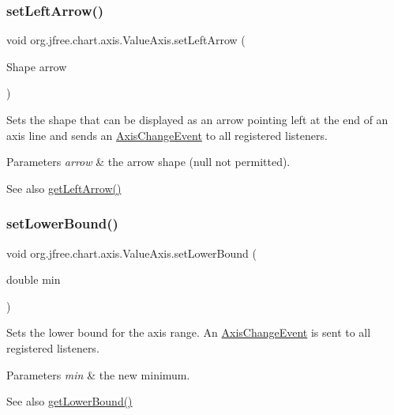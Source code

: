 \subsubsection{\texorpdfstring{set\+Left\+Arrow()}{setLeftArrow()}}
{\footnotesize\ttfamily void org.\+jfree.\+chart.\+axis.\+Value\+Axis.\+set\+Left\+Arrow (\begin{DoxyParamCaption}\item[{Shape}]{arrow }\end{DoxyParamCaption})}

Sets the shape that can be displayed as an arrow pointing left at the end of an axis line and sends an \mbox{\hyperlink{}{Axis\+Change\+Event}} to all registered listeners.


\begin{DoxyParams}{Parameters}
{\em arrow} & the arrow shape ({\ttfamily null} not permitted).\\
\hline
\end{DoxyParams}
\begin{DoxySeeAlso}{See also}
\mbox{\hyperlink{classorg_1_1jfree_1_1chart_1_1axis_1_1_value_axis_a68bc86e19cb0a68264f057981ecb4963}{get\+Left\+Arrow()}} 
\end{DoxySeeAlso}
\mbox{\label{classorg_1_1jfree_1_1chart_1_1axis_1_1_value_axis_a0d48d13633027f697aa6f909bc39444c}} 
\subsubsection{\texorpdfstring{set\+Lower\+Bound()}{setLowerBound()}}
{\footnotesize\ttfamily void org.\+jfree.\+chart.\+axis.\+Value\+Axis.\+set\+Lower\+Bound (\begin{DoxyParamCaption}\item[{double}]{min }\end{DoxyParamCaption})}

Sets the lower bound for the axis range. An \mbox{\hyperlink{}{Axis\+Change\+Event}} is sent to all registered listeners.


\begin{DoxyParams}{Parameters}
{\em min} & the new minimum.\\
\hline
\end{DoxyParams}
\begin{DoxySeeAlso}{See also}
\mbox{\hyperlink{classorg_1_1jfree_1_1chart_1_1axis_1_1_value_axis_afaef2ebef47d76549601084111009521}{get\+Lower\+Bound()}} 
\end{DoxySeeAlso}
\mbox{\label{classorg_1_1jfree_1_1chart_1_1axis_1_1_value_axis_a74bac229eb07e3502a9ca3934563a636}} 
